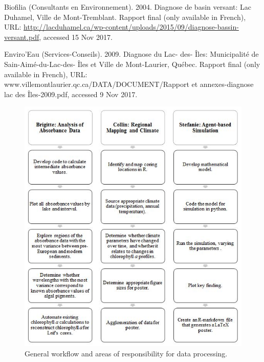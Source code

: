 \documentclass[]{article}
\begin{document}
Biofilia (Consultants en Environnement). 2004. Diagnose de basin
versant: Lac Duhamel, Ville de Mont-Tremblant. Rapport final (only
available in French), URL:
\url{http://lacduhamel.ca/wp-content/uploads/2015/09/diagnose-bassin-versant.pdf},
accessed 15 Nov 2017.

Enviro'Eau (Services-Conseils). 2009. Diagnose du Lac- des- Îles:
Municipalité de Sain-Aimé-du-Lac-des- Îles et Ville de Mont-Laurier,
Québec. Rapport final (only available in French), URL:
www.villemontlaurier.qc.ca/DATA/DOCUMENT/Rapport et annexes-diagnose lac
des Îles-2009.pdf, accessed 9 Nov 2017.

\begin{figure}
\centering
\includegraphics{Figure 1.eps}
\caption{General workflow and areas of responsibility for data
processing.}
\end{figure}
\end{document}
